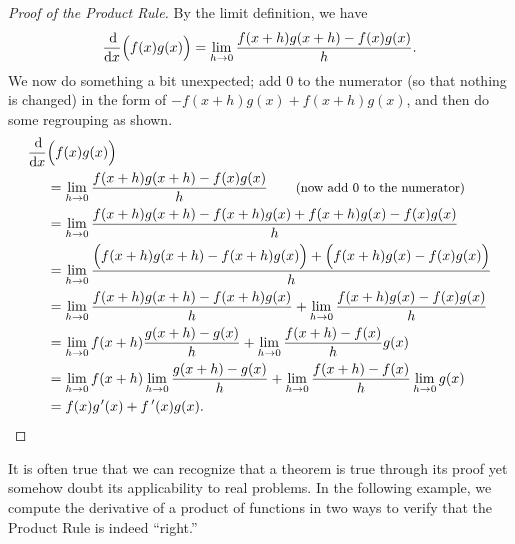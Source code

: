 \begin{proof}[Proof of the Product Rule]
By the limit definition, we have 
\[\frac{\operatorname{d}\!}{\operatorname{d}\! x}\Bigl(f(x)g(x)\Bigr) =\lim_{h\to0} \frac{f(x+h)g(x+h)-f(x)g(x)}{h}.\]
We now do something a bit unexpected; add 0 to the numerator (so that nothing is changed) in the form of $-f(x+h)g(x)+f(x+h)g(x)$, and then do some regrouping as shown.
\begin{align*}
	\dfrac{\dd}{\dd x}&\Bigl(f(x)g(x)\Bigr) \\
	&=\lim_{h\to0} \frac{f(x+h)g(x+h)-f(x)g(x)}{h}
	\qquad\text{\small(now add 0 to the numerator)}\\
	&=\lim_{h\to0} \frac{f(x+h)g(x+h)-f(x+h)g(x)+f(x+h)g(x)-f(x)g(x)}{h} \\
	&=\lim_{h\to0} \frac{\Bigl(f(x+h)g(x+h)-f(x+h)g(x)\Bigr)+\Bigl(f(x+h)g(x)-f(x)g(x)\Bigr)}{h} \\
	&=\lim_{h\to0} \frac{f(x+h)g(x+h)-f(x+h)g(x)}{h}+\lim_{h\to0}\frac{f(x+h)g(x)-f(x)g(x)}{h} \\ %
	&=\lim_{h\to0} f(x+h)\frac{g(x+h)-g(x)}{h}+\lim_{h\to0}\frac{f(x+h)-f(x)}{h}g(x) \\ %
	&=\lim_{h\to0} f(x+h)\lim_{h\to0}\frac{g(x+h)-g(x)}{h}+\lim_{h\to0}\frac{f(x+h)-f(x)}{h}\lim_{h\to0}g(x) \\ %
	&=f(x)g\primeskip'(x) + \fp(x)g(x).\qedhere
\end{align*}
\end{proof}

It is often true that we can recognize that a theorem is true through its proof yet somehow doubt its applicability to real problems. In the following example, we compute the derivative of a product of functions in two ways to verify that the Product Rule is indeed ``right.''

